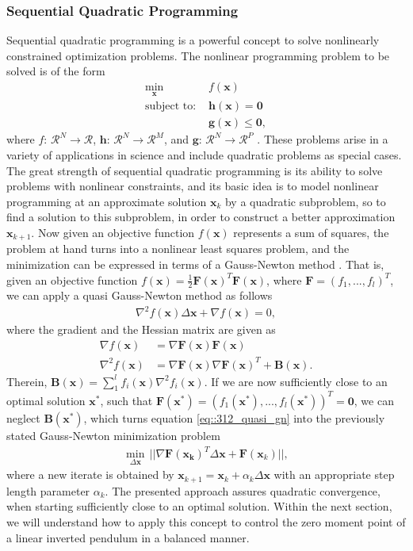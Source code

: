 \subsubsection{Sequential Quadratic Programming}
\label{sec::312_sqp}
Sequential quadratic programming is a powerful concept to solve nonlinearly constrained optimization problems. The nonlinear programming problem to be solved is of the form
\begin{align}
	\min_{\bm{x}}\, &f(\bm{x})
	\label{eq::312_objective}\\
	\text{subject to: } &\bm{h}(\bm{x}) = \bm{0}\\
	&\bm{g}(\bm{x}) \leq \bm{0},
\end{align}
where $f:\,\mathcal{R}^N\rightarrow\mathcal{R}$, $\bm{h}:\,\mathcal{R}^N\rightarrow\mathcal{R}^M$, and $\bm{g}:\,\mathcal{R}^N\rightarrow\mathcal{R}^P$ \cite{boggs1995sequential}. These problems arise in a variety of applications in science and include quadratic problems as special cases. The great strength of sequential quadratic programming is its ability to solve problems with nonlinear constraints, and its basic idea is to model nonlinear programming at an approximate solution $\bm{x}_k$ by a quadratic subproblem, so to find a solution to this subproblem, in order to construct a better approximation $\bm{x}_{k+1}$. Now given an objective function $f(\bm{x})$ represents a sum of squares, the problem at hand turns into a nonlinear least squares problem, and the minimization can be expressed in terms of a Gauss-Newton method \cite{schittkowski1988solving}. That is, given an objective function $f(\bm{x}) = \frac{1}{2}\bm{F}(\bm{x})^T\bm{F}(\bm{x})$, where $\bm{F}=\left(f_1,...,f_l\right)^T$, we can apply a quasi Gauss-Newton method as follows
\begin{align}
	\nabla^2f(\bm{x})\Delta\bm{x} + \nabla f(\bm{x}) = 0,
	\label{eq::312_quasi_gn}
\end{align}
where the gradient and the Hessian matrix are given as
\begin{align}
	\nabla f(\bm{x}) &= \nabla \bm{F}(\bm{x})\bm{F}(\bm{x}) \\
	\nabla^2 f(\bm{x}) &= \nabla \bm{F}(\bm{x})\nabla\bm{F}(\bm{x})^T + \bm{B}(\bm{x}).
\end{align}
Therein, $\bm{B}(\bm{x}) = \sum_1^lf_i(\bm{x})\nabla^2f_i(\bm{x})$. If we are now sufficiently close to an optimal solution $\bm{x}^*$, such that $\bm{F}(\bm{x}^*) = \left(f_1(\bm{x}^*),...,f_l(\bm{x}^*)\right)^T=\bm{0}$, we can neglect $\bm{B}(\bm{x^*})$, which turns equation \ref{eq::312_quasi_gn} into the previously stated Gauss-Newton minimization problem
\begin{align}
	\min_{\Delta\bm{x}}\,||\nabla\bm{F}(\bm{x_k})^T\Delta\bm{x}+\bm{F}(\bm{x}_k)||,
	\label{eq::312_gn_min}
\end{align}
where a new iterate is obtained by $\bm{x}_{k+1}=\bm{x}_k + \alpha_k\Delta \bm{x}$ with an appropriate step length parameter $\alpha_k$. The presented approach assures quadratic convergence, when starting sufficiently close to an optimal solution. Within the next section, we will understand how to apply this concept to control the zero moment point of a linear inverted pendulum in a balanced manner.
